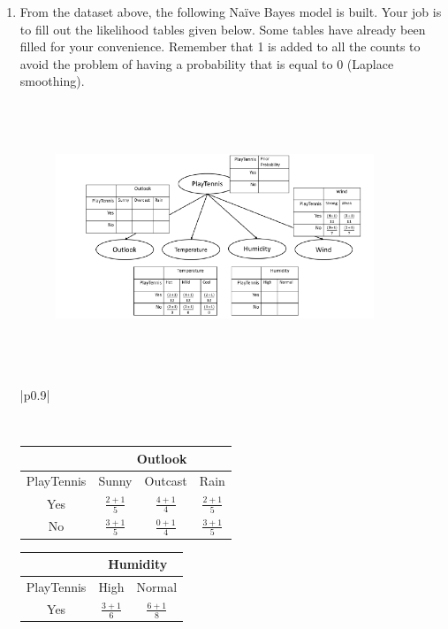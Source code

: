 \documentclass[10pt]{article}
\newenvironment{answer}
    {\begin{center}
    \begin{tabular}{|p{0.9\textwidth}|}
    \hline
    }
    { 
    \\\hline
    \end{tabular} 
    \end{center}
    }
\begin{document}
\begin{enumerate}[resume]
\begin{enumerate}
    \item From the dataset above, the following Naïve Bayes model is built. Your job is to fill out the
      likelihood tables given below. Some tables have already been filled for your convenience.
      Remember that 1 is added to all the counts to avoid the problem of having a probability that is
      equal to 0 (Laplace smoothing).
      \begin{figure}[h!]
      \centering
      \includegraphics[width=0.9\textwidth,height=8cm]{hw3_6.png}
    \end{figure}
    \begin{answer}
      \\
      \begin{minipage}{0.6\linewidth}
        \begin{tabular}{|c|c|c|c|}
          \hline
          & \multicolumn{3}{|c|}{Outlook} \\
          \hline
          PlayTennis & Sunny & Outcast & Rain \\
          \hline
          Yes & $\frac{2+1}{5}$ & $\frac{4+1}{4}$ & $\frac{2+1}{5}$ \\
          \hline
          No & $\frac{3+1}{5}$ & $\frac{0+1}{4}$ & $\frac{3+1}{5}$ \\
          \hline
        \end{tabular}
      \end{minipage}      
      \begin{minipage}{0.1\linewidth}
        \begin{tabular}{|c|c|c|}
          \hline
          & \multicolumn{2}{|c|}{Humidity} \\
          \hline
          PlayTennis & High & Normal \\
          \hline
          Yes & $\frac{3+1}{6}$ & $\frac{6+1}{8}$ \\

\end{tabular}
\end{minipage}
\end{answer}
\end{enumerate}
\end{enumerate}
\end{document}
